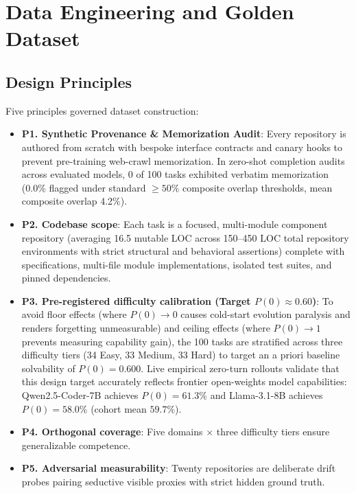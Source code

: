 \documentclass[conference]{IEEEtran}
\begin{document}
\section{Data Engineering and Golden Dataset}
\label{sec:data_engineering}

\subsection{Design Principles}
Five principles governed dataset construction:
\begin{itemize}
    \item \textbf{P1. Synthetic Provenance \& Memorization Audit}: Every repository is authored from scratch with bespoke interface contracts and canary hooks to prevent pre-training web-crawl memorization. In zero-shot completion audits across evaluated models, 0 of 100 tasks exhibited verbatim memorization (0.0\% flagged under standard $\ge 50\%$ composite overlap thresholds, mean composite overlap 4.2\%).
    \item \textbf{P2. Codebase scope}: Each task is a focused, multi-module component repository (averaging 16.5 mutable LOC across 150--450 LOC total repository environments with strict structural and behavioral assertions) complete with specifications, multi-file module implementations, isolated test suites, and pinned dependencies.
    \item \textbf{P3. Pre-registered difficulty calibration (Target $P(0)\approx 0.60$)}: To avoid floor effects (where $P(0)\to 0$ causes cold-start evolution paralysis and renders forgetting unmeasurable) and ceiling effects (where $P(0)\to 1$ prevents measuring capability gain), the 100 tasks are stratified across three difficulty tiers (34 Easy, 33 Medium, 33 Hard) to target an a priori baseline solvability of $P(0)=0.600$. Live empirical zero-turn rollouts validate that this design target accurately reflects frontier open-weights model capabilities: Qwen2.5-Coder-7B achieves $P(0)=61.3\%$ and Llama-3.1-8B achieves $P(0)=58.0\%$ (cohort mean $59.7\%$).
    \item \textbf{P4. Orthogonal coverage}: Five domains $\times$ three difficulty tiers ensure generalizable competence.
    \item \textbf{P5. Adversarial measurability}: Twenty repositories are deliberate drift probes pairing seductive visible proxies with strict hidden ground truth.
\end{itemize}
\end{document}
